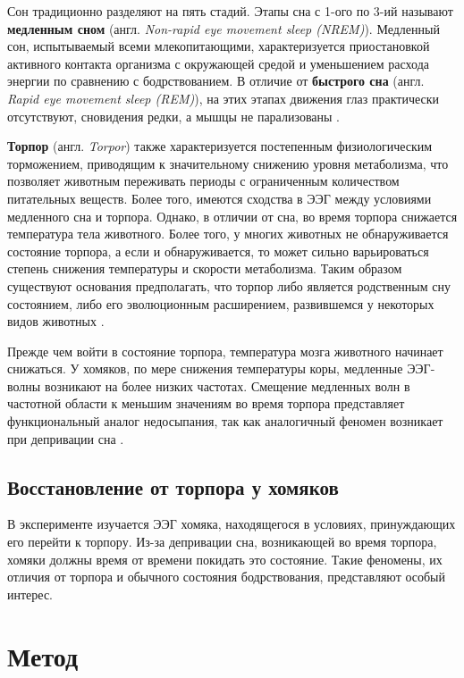 \documentclass[12pt,a4paper,oneside]{article}
\begin{document}
Сон традиционно разделяют на пять стадий. Этапы сна с 1-ого по 3-ий называют \textbf{медленным сном} (англ. \textit{Non-rapid eye movement sleep (NREM)}). Медленный сон, испытываемый всеми млекопитающими, характеризуется приостановкой активного контакта организма с окружающей средой и уменьшением расхода энергии по сравнению с бодрствованием. В отличие от \textbf{быстрого сна} (англ. \textit{Rapid eye movement sleep (REM)}), на этих этапах движения глаз практически отсутствуют, сновидения редки, а мышцы не парализованы \cite{McCarley2007}. 

\textbf{Торпор} (англ. \textit{Torpor}) также характеризуется постепенным физиологическим торможением, приводящим к значительному снижению уровня метаболизма, что позволяет животным переживать периоды с ограниченным количеством питательных веществ. Более того, имеются сходства в ЭЭГ между условиями медленного сна и торпора. Однако, в отличии от сна, во время торпора снижается температура тела животного. Более того, у многих животных не обнаруживается состояние торпора, а если и обнаруживается, то может сильно варьироваться степень снижения температуры и скорости метаболизма. Таким образом существуют основания предполагать, что торпор либо является родственным сну состоянием, либо его эволюционным расширением, развившемся у некоторых видов животных \cite{Silvani2018}. 

Прежде чем войти в состояние торпора, температура мозга животного начинает снижаться. У хомяков, по мере снижения температуры коры, медленные ЭЭГ-волны возникают на более низких частотах. Смещение медленных волн в частотной области к меньшим значениям во время торпора представляет функциональный аналог недосыпания, так как аналогичный феномен возникает при депривации сна \cite{Silvani2018}.

\subsection{Восстановление от торпора у хомяков}

В эксперименте изучается ЭЭГ хомяка, находящегося в условиях, принуждающих его перейти к торпору. Из-за депривации сна, возникающей во время торпора, хомяки должны время от времени покидать это состояние. Такие феномены, их отличия от торпора и обычного состояния бодрствования, представляют особый интерес.

\section{Метод} %
\end{document}
